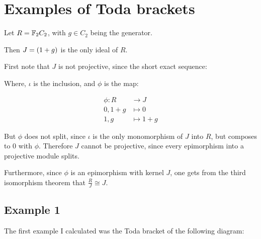 \section{Examples of Toda brackets}

Let \( R = \mathbb{F}_2C_2 \), with \( g \in C_2 \) being the generator.

Then \( J = \left(1 + g\right) \) is the only ideal of \( R \).

First note that \( J \) is not projective, since the short exact sequence:

\begin{center}
\end{center}

Where, \( \iota \) is the inclusion, and \( \phi \) is the map:

\begin{align*}
    \phi: R &\to J \\
    0, 1 + g &\mapsto 0 \\
    1, g &\mapsto 1 + g
\end{align*}

But \( \phi \) does not split, since \( \iota \) is the only monomorphism of \( J \) into \( R \), but composes to \( 0 \) with \( \phi \). Therefore \( J \) cannot be projective, since every epimorphism into a projective module splits.

Furthermore, since \( \phi \) is an epimorphism with kernel \( J \), one gets from the third isomorphism theorem that \( \frac{R}{J} \cong J \).

\subsection{Example 1}

The first example I calculated was the Toda bracket of the following diagram:

\begin{center}
\end{center}


